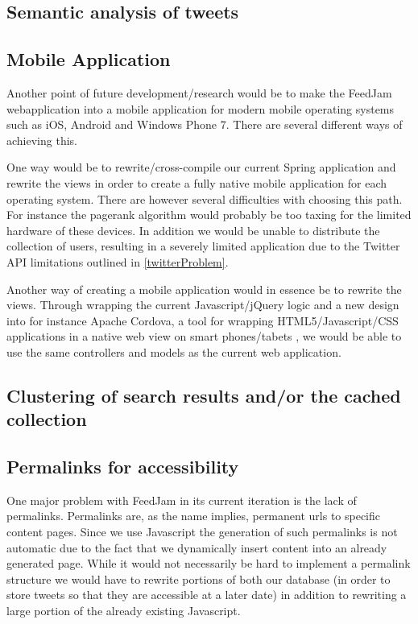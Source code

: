 \subsection{Semantic analysis of tweets} %
\label{semtanticAnalysation}

\subsection{Mobile Application}
Another point of future development/research would be to make the FeedJam webapplication into a mobile application for modern mobile operating systems such as iOS, Android and Windows Phone 7. There are several different ways of achieving this. 

One way would be to rewrite/cross-compile our current Spring application and rewrite the views in order to create a fully native mobile application for each operating system. There are however several difficulties with choosing this path. For instance the pagerank algorithm would probably be too taxing for the limited hardware of these devices. In addition we would be unable to distribute the collection of users, resulting in a severely limited application due to the Twitter API limitations outlined in \ref{twitterProblem}.

Another way of creating a mobile application would in essence be to rewrite the views. Through wrapping the current Javascript/jQuery logic and a new design into for instance Apache Cordova, a tool for wrapping HTML5/Javascript/CSS applications in a native web view on smart phones/tabets \cite{ApacheCordova}, we would be able to use the same controllers and models as the current web application.

\subsection{Clustering of search results and/or the cached collection} %

\subsection{Permalinks for accessibility}
One major problem with FeedJam in its current iteration is the lack of permalinks. Permalinks are, as the name implies, permanent urls to specific content pages. Since we use Javascript the generation of such permalinks is not automatic due to the fact that we dynamically insert content into an already generated page. While it would not necessarily be hard to implement a permalink structure we would have to rewrite portions of both our database (in order to store tweets so that they are accessible at a later date) in addition to rewriting a large portion of the already existing Javascript.